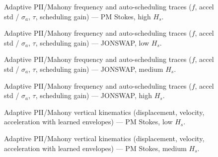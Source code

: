 \documentclass[11pt,letterpaper]{article}
\begin{document}
\begin{figure}[H]\centering
  \resizebox{\textwidth}{!}{}
  \caption{Adaptive PII/Mahony frequency and auto-scheduling traces ($f$, accel std / $\sigma_a$, $\tau$, scheduling gain) --- PM Stokes, high $H_s$.}
  \label{fig:w3d_nonkalman_pmstokes_high_tuner}
\end{figure}

\begin{figure}[H]\centering
  \resizebox{\textwidth}{!}{}
  \caption{Adaptive PII/Mahony frequency and auto-scheduling traces ($f$, accel std / $\sigma_a$, $\tau$, scheduling gain) --- JONSWAP, low $H_s$.}
  \label{fig:w3d_nonkalman_jonswap_low_tuner}
\end{figure}

\begin{figure}[H]\centering
  \resizebox{\textwidth}{!}{}
  \caption{Adaptive PII/Mahony frequency and auto-scheduling traces ($f$, accel std / $\sigma_a$, $\tau$, scheduling gain) --- JONSWAP, medium $H_s$.}
  \label{fig:w3d_nonkalman_jonswap_medium_tuner}
\end{figure}

\begin{figure}[H]\centering
  \resizebox{\textwidth}{!}{}
  \caption{Adaptive PII/Mahony frequency and auto-scheduling traces ($f$, accel std / $\sigma_a$, $\tau$, scheduling gain) --- JONSWAP, high $H_s$.}
  \label{fig:w3d_nonkalman_jonswap_high_tuner}
\end{figure}



\begin{figure}[H]\centering
  \resizebox{\textwidth}{!}{}
  \caption{Adaptive PII/Mahony vertical kinematics (displacement, velocity, acceleration with learned envelopes) --- PM Stokes, low $H_s$.}
  \label{fig:w3d_nonkalman_pmstokes_low_zkin}
\end{figure}

\begin{figure}[H]\centering
  \resizebox{\textwidth}{!}{}
  \caption{Adaptive PII/Mahony vertical kinematics (displacement, velocity, acceleration with learned envelopes) --- PM Stokes, medium $H_s$.}
  \label{fig:w3d_nonkalman_pmstokes_medium_zkin}
\end{figure}
\end{document}
